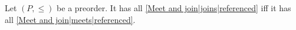 
Let $(P,\leq)$ be a preorder. It has all \ref{Meet and join|joins|referenced} iff it has all \ref{Meet and join|meets|referenced}.